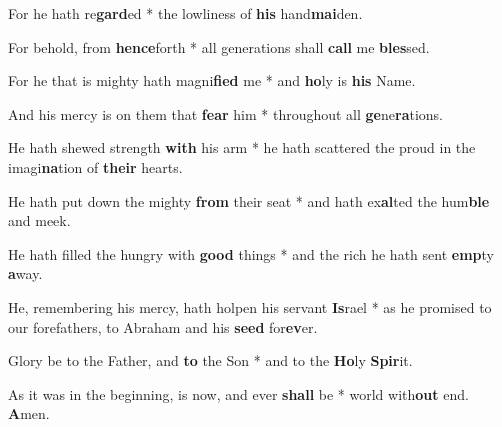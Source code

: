 \begin{multicols}{2}
	For he hath re\textbf{gard}ed * the lowliness of \textbf{his} hand\textbf{mai}den.
	
	For behold, from \textbf{hence}forth * all generations shall \textbf{call} me \textbf{bles}sed.
	
	For he that is mighty hath magni\textbf{fied} me * and \textbf{ho}ly is \textbf{his} Name.
	
	And his mercy is on them that \textbf{fear} him * throughout all \textbf{ge}ne\textbf{ra}tions.
	
	He hath shewed strength \textbf{with} his arm * he hath scattered the proud in the imagi\textbf{na}tion of \textbf{their} hearts.
	
	He hath put down the mighty \textbf{from} their seat * and hath ex\textbf{al}ted the hum\textbf{ble} and meek.
	
	He hath filled the hungry with \textbf{good} things * and the rich he hath sent \textbf{emp}ty \textbf{a}way.
	
	He, remembering his mercy, hath holpen his servant \textbf{Is}rael * as he promised to our forefathers, to Abraham and his \textbf{seed} for\textbf{ev}er.
	
	Glory be to the Father, and \textbf{to} the Son * and to the \textbf{Ho}ly \textbf{Spir}it.
	
	As it was in the beginning, is now, and ever \textbf{shall} be * world with\textbf{out} end. \textbf{A}men.
\end{multicols}